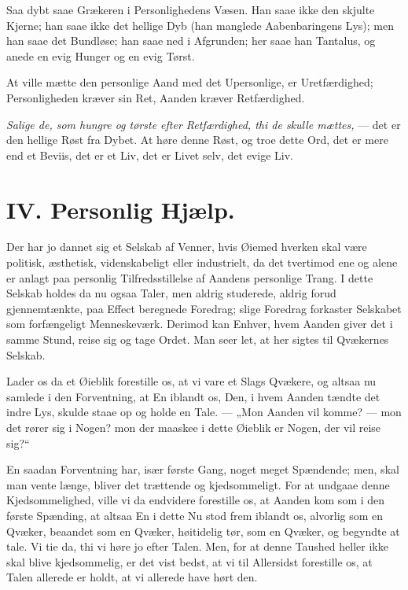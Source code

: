\documentclass[12pt,a4paper]{book}
\newcommand{\apage}[1]{\marginnote{\footnotesize\textit{[#1]}}}
\begin{document}
Saa dybt saae Grækeren i Personlighedens Væsen. Han saae ikke den skjulte
Kjerne; han saae ikke det hellige Dyb (han manglede Aabenbaringens Lys);
men han saae det Bundløse; han saae ned i Afgrunden; her saae han
Tantalus, og anede en evig Hunger og en evig Tørst.

At ville mætte den personlige Aand med det Upersonlige, er Uretfærdighed;
Personligheden kræver sin Ret, Aanden kræver Retfærdighed.

\emph{Salige de, som hungre og tørste efter Retfærdighed, thi de skulle
mættes,} --- det er den hellige Røst fra Dybet. At høre denne Røst, og
troe dette Ord, det er mere end et Beviis, det er et Liv, det er Livet
selv, det evige Liv.

\chapter*{IV. Personlig Hjælp.}
\label{ch:forel4} \apage{33}

Der har jo dannet sig et Selskab af Venner, hvis Øiemed hverken skal være
politisk, æsthetisk, videnskabeligt eller industrielt, da det tvertimod ene
og alene er anlagt paa personlig Tilfredsstillelse af Aandens personlige
Trang. I dette Selskab holdes da nu ogsaa Taler, men aldrig studerede,
aldrig forud gjennemtænkte, paa Effect beregnede Foredrag; slige Foredrag
forkaster Selskabet som forfængeligt Menneskeværk. Derimod kan Enhver,
hvem Aanden giver det i samme Stund, reise sig og tage Ordet. Man seer
let, at her sigtes til Qvækernes Selskab.

Lader os da et Øieblik forestille os, at vi vare et Slags Qvækere, og
altsaa nu samlede i den Forventning, at En iblandt os, Den, i hvem Aanden
tændte det indre Lys, skulde staae op og holde en Tale. — „Mon Aanden vil
komme? — mon det rører sig i Nogen? mon der maaskee i dette Øieblik er
Nogen, der vil reise sig?“

En saadan Forventning har, især første Gang, noget meget Spændende; men,
skal man vente længe, bliver det trættende og kjedsommeligt. For at
undgaae denne Kjedsommelighed, ville vi da endvidere forestille os, at
Aanden kom som i den første Spænding, at altsaa En i dette Nu stod frem
iblandt os, alvorlig som en Qvæker, beaandet som en Qvæker,
høitidelig tør, som en Qvæker, og begyndte at tale. \apage{34} Vi tie da, thi vi høre
jo efter Talen. Men, for at denne Taushed heller ikke skal blive
kjedsommelig, er det vist bedst, at vi til Allersidst forestille os, at
Talen allerede er holdt, at vi allerede have hørt den.
\end{document}
